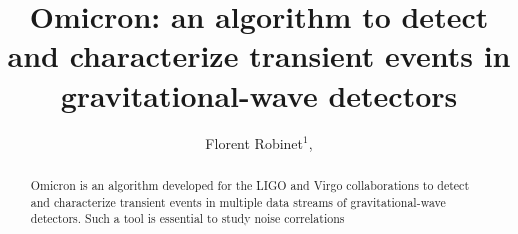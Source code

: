 \documentclass[aps]{revtex4-1}
\begin{document}

\title{Omicron: an algorithm to detect and characterize transient events in gravitational-wave detectors}

\begin{abstract}
  Omicron is an algorithm developed for the LIGO and Virgo collaborations to detect and characterize transient events in multiple data streams of gravitational-wave detectors. Such a tool is essential to study noise correlations
\end{abstract}

\author{
  Florent Robinet$^1$,  
}
        
\address{$^1$LAL, Univ Paris-Sud, CNRS/IN2P3, Orsay, France}

\maketitle










\end{document}
